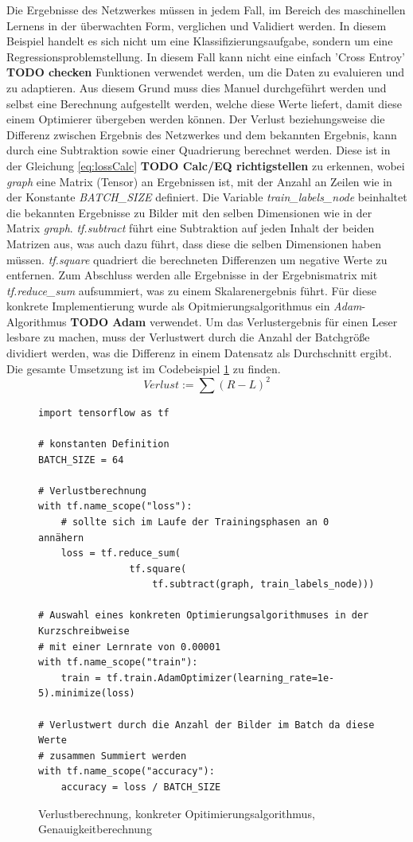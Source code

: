 Die Ergebnisse des Netzwerkes müssen in jedem Fall, im Bereich des maschinellen Lernens in der überwachten Form, verglichen und Validiert werden. 
In diesem Beispiel handelt es sich nicht um eine Klassifizierungsaufgabe, sondern um eine Regressionsproblemstellung. 
In diesem Fall kann nicht eine einfach 'Cross Entroy' \textbf{TODO checken} Funktionen verwendet werden, um die Daten zu evaluieren und zu adaptieren. 
Aus diesem Grund muss dies Manuel durchgeführt werden und selbst eine Berechnung aufgestellt werden, welche diese Werte liefert, damit diese einem Optimierer übergeben werden können. 
Der Verlust beziehungsweise die Differenz zwischen Ergebnis des Netzwerkes und dem bekannten Ergebnis, kann durch eine Subtraktion sowie einer Quadrierung berechnet werden. 
Diese ist in der Gleichung \ref{eq:lossCalc} \textbf{TODO Calc/EQ richtigstellen} zu erkennen, wobei \textit{graph} eine Matrix (Tensor) an Ergebnissen ist, mit der Anzahl an Zeilen wie in der Konstante \textit{BATCH\_SIZE} definiert. 
Die Variable \textit{train\_labels\_node} beinhaltet die bekannten Ergebnisse zu Bilder mit den selben Dimensionen wie in der Matrix \textit{graph}. 
\textit{tf.subtract} führt eine Subtraktion auf jeden Inhalt der beiden Matrizen aus, was auch dazu führt, dass diese die selben Dimensionen haben müssen. 
\textit{tf.square} quadriert die berechneten Differenzen um negative Werte zu entfernen. 
Zum Abschluss werden alle Ergebnisse in der Ergebnismatrix mit \textit{tf.reduce\_sum} aufsummiert, was zu einem Skalarenergebnis führt. 
Für diese konkrete Implementierung wurde als Opitmierungsalgorithmus ein \textit{Adam}-Algorithmus \textbf{TODO Adam} verwendet. 
Um das Verlustergebnis für einen Leser lesbare zu machen, muss der Verlustwert durch die Anzahl der Batchgröße dividiert werden, was die Differenz in einem Datensatz als Durchschnitt ergibt. 
Die gesamte Umsetzung ist im Codebeispiel \ref{fig:VerlustKonkreOpitimier} zu finden. 
\begin{equation}
	Verlust := \sum{(R - L)^2}
	\label{eq:lossCalc}
\end{equation}
\begin{figure}[ht!]
\lstset{language=Python}
\begin{lstlisting}
import tensorflow as tf

# konstanten Definition
BATCH_SIZE = 64

# Verlustberechnung
with tf.name_scope("loss"):
    # sollte sich im Laufe der Trainingsphasen an 0 annähern
    loss = tf.reduce_sum(
    			tf.square(
    				tf.subtract(graph, train_labels_node)))

# Auswahl eines konkreten Optimierungsalgorithmuses in der Kurzschreibweise
# mit einer Lernrate von 0.00001
with tf.name_scope("train"):
    train = tf.train.AdamOptimizer(learning_rate=1e-5).minimize(loss)
    
# Verlustwert durch die Anzahl der Bilder im Batch da diese Werte 
# zusammen Summiert werden
with tf.name_scope("accuracy"):    
    accuracy = loss / BATCH_SIZE
\end{lstlisting}
	\caption{Verlustberechnung, konkreter Opitimierungsalgorithmus, Genauigkeitberechnung}
	\label{fig:VerlustKonkreOpitimier}
\end{figure}
 
